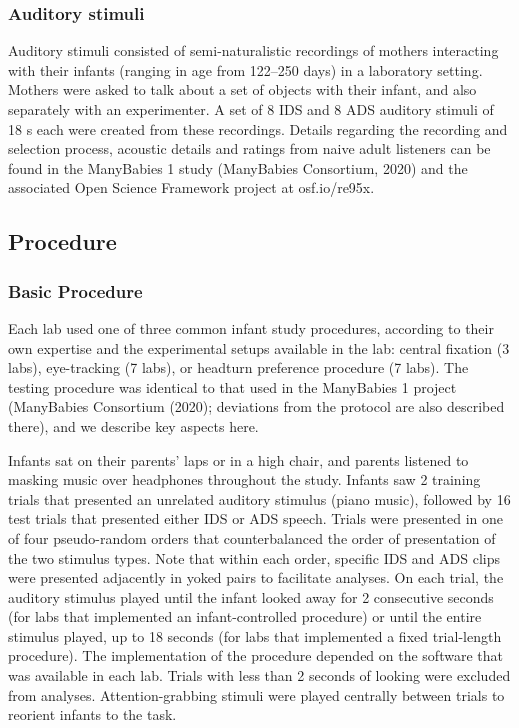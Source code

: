 \documentclass[
  english,
  ,man,floatsintext]{apa6}
\begin{document}
\hypertarget{auditory-stimuli}{%
\subsubsection{Auditory stimuli}\label{auditory-stimuli}}

Auditory stimuli consisted of semi-naturalistic recordings of mothers interacting with their infants (ranging in age from 122--250 days) in a laboratory setting. Mothers were asked to talk about a set of objects with their infant, and also separately with an experimenter. A set of 8 IDS and 8 ADS auditory stimuli of 18 s each were created from these recordings. Details regarding the recording and selection process, acoustic details and ratings from naive adult listeners can be found in the ManyBabies 1 study (ManyBabies Consortium, 2020) and the associated Open Science Framework project at osf.io/re95x.

\hypertarget{procedure}{%
\subsection{Procedure}\label{procedure}}

\hypertarget{basic-procedure}{%
\subsubsection{Basic Procedure}\label{basic-procedure}}

Each lab used one of three common infant study procedures, according to their own expertise and the experimental setups available in the lab: central fixation (3 labs), eye-tracking (7 labs), or headturn preference procedure (7 labs). The testing procedure was identical to that used in the ManyBabies 1 project (ManyBabies Consortium (2020); deviations from the protocol are also described there), and we describe key aspects here.

Infants sat on their parents' laps or in a high chair, and parents listened to masking music over headphones throughout the study. Infants saw 2 training trials that presented an unrelated auditory stimulus (piano music), followed by 16 test trials that presented either IDS or ADS speech. Trials were presented in one of four pseudo-random orders that counterbalanced the order of presentation of the two stimulus types. Note that within each order, specific IDS and ADS clips were presented adjacently in yoked pairs to facilitate analyses. On each trial, the auditory stimulus played until the infant looked away for 2 consecutive seconds (for labs that implemented an infant-controlled procedure) or until the entire stimulus played, up to 18 seconds (for labs that implemented a fixed trial-length procedure). The implementation of the procedure depended on the software that was available in each lab. Trials with less than 2 seconds of looking were excluded from analyses. Attention-grabbing stimuli were played centrally between trials to reorient infants to the task.
\end{document}
